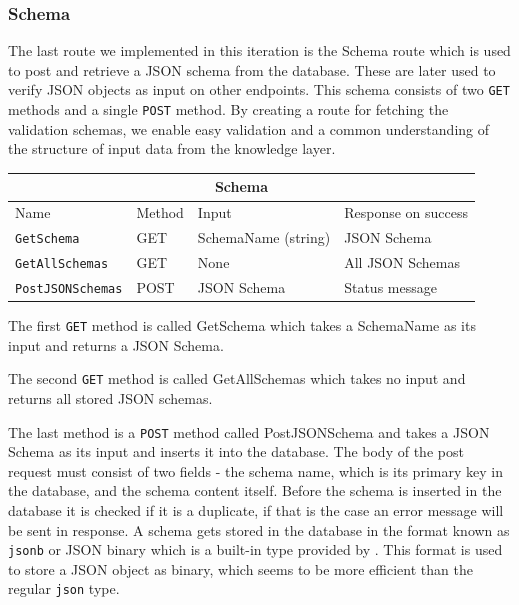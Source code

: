 \subsubsection{Schema}
The last route we implemented in this iteration is the Schema route which is used to post and retrieve a JSON schema from the database. These are later used to verify JSON objects as input on other endpoints. 
This schema consists of two \texttt{GET} methods and a single \texttt{POST} method.
By creating a route for fetching the validation schemas, we enable easy validation and a common understanding of the structure of input data from the knowledge layer.
\begin{table}[h]
    \begin{tabular}{|llll|}
    \hline
    \multicolumn{4}{|c|}{\textbf{Schema}}                                                                                                     \\ \hline
    \multicolumn{1}{|l|}{Name}                     & \multicolumn{1}{l|}{Method} & \multicolumn{1}{l|}{Input}               & Response on success \\ \hline
    \multicolumn{1}{|l|}{\texttt{GetSchema}}       & \multicolumn{1}{l|}{GET}    & \multicolumn{1}{l|}{SchemaName (string)} & JSON Schema         \\ \hline
    \multicolumn{1}{|l|}{\texttt{GetAllSchemas}}   & \multicolumn{1}{l|}{GET}    & \multicolumn{1}{l|}{None}                & All JSON Schemas    \\ \hline
    \multicolumn{1}{|l|}{\texttt{PostJSONSchemas}} & \multicolumn{1}{l|}{POST}   & \multicolumn{1}{l|}{JSON Schema}         & Status message      \\ \hline
    \end{tabular}
\end{table}

The first \texttt{GET} method is called GetSchema which takes a SchemaName as its input and returns a JSON Schema. 

The second \texttt{GET} method is called GetAllSchemas which takes no input and returns all stored JSON schemas. 

The last method is a \texttt{POST} method called PostJSONSchema and takes a JSON Schema as its input and inserts it into the database.
The body of the post request must consist of two fields - the schema name, which is its primary key in the database, and the schema content itself. Before the schema is inserted in the database it is checked if it is a duplicate, if that is the case an error message will be sent in response.
A schema gets stored in the database in the format known as \texttt{jsonb} or JSON binary which is a built-in type provided by \postgres{}.
This format is used to store a JSON object as binary, which seems to be more efficient than the regular \texttt{json} type\cite{FasterOperationsJSONB2017}.
